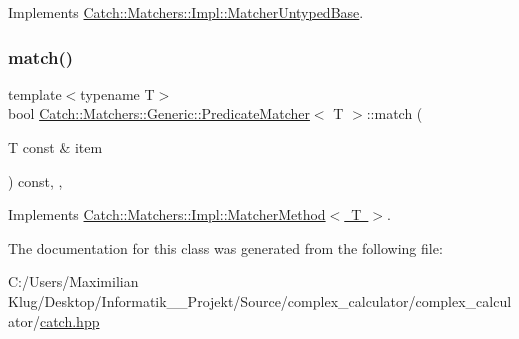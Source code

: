 Implements \mbox{\hyperlink{class_catch_1_1_matchers_1_1_impl_1_1_matcher_untyped_base_a91d3a907dbfcbb596077df24f6e11fe2}{Catch\+::\+Matchers\+::\+Impl\+::\+Matcher\+Untyped\+Base}}.

\mbox{\label{class_catch_1_1_matchers_1_1_generic_1_1_predicate_matcher_a2ec0e8ec19c4c5e26271d59a06a62b52}} 
\subsubsection{\texorpdfstring{match()}{match()}}
{\footnotesize\ttfamily template$<$typename T$>$ \\
bool \mbox{\hyperlink{class_catch_1_1_matchers_1_1_generic_1_1_predicate_matcher}{Catch\+::\+Matchers\+::\+Generic\+::\+Predicate\+Matcher}}$<$ T $>$\+::match (\begin{DoxyParamCaption}\item[{T const \&}]{item }\end{DoxyParamCaption}) const\hspace{0.3cm}{\ttfamily [inline]}, {\ttfamily [override]}, {\ttfamily [virtual]}}



Implements \mbox{\hyperlink{struct_catch_1_1_matchers_1_1_impl_1_1_matcher_method_ae0920ff9e817acf08e1bb0cbcb044e30}{Catch\+::\+Matchers\+::\+Impl\+::\+Matcher\+Method$<$ T $>$}}.



The documentation for this class was generated from the following file\+:\begin{DoxyCompactItemize}
\item 
C\+:/\+Users/\+Maximilian Klug/\+Desktop/\+Informatik\+\_\+\_\+\+Projekt/\+Source/complex\+\_\+calculator/complex\+\_\+calculator/\mbox{\hyperlink{catch_8hpp}{catch.\+hpp}}\end{DoxyCompactItemize}
